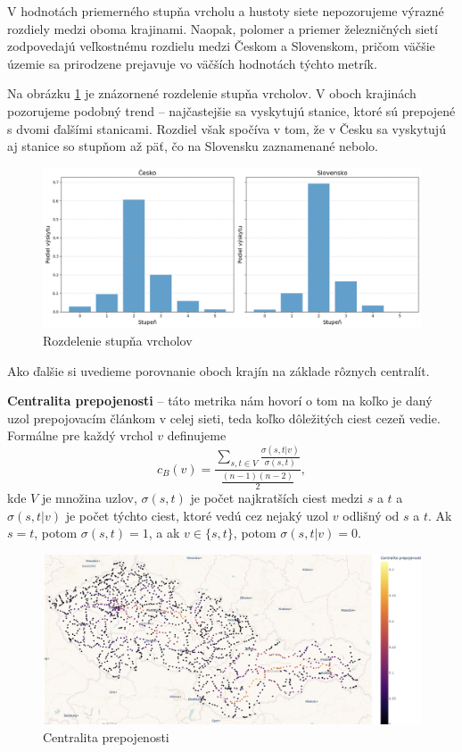 \documentclass[main.tex]{subfiles}
\begin{document}
V hodnotách priemerného stupňa vrcholu a hustoty siete nepozorujeme výrazné rozdiely medzi oboma krajinami. Naopak, polomer a priemer železničných sietí zodpovedajú veľkostnému rozdielu medzi Českom a Slovenskom, pričom väčšie územie sa prirodzene prejavuje vo väčších hodnotách týchto metrík.

Na obrázku \ref{obr:degree_distrib} je znázornené rozdelenie stupňa vrcholov. V oboch krajinách pozorujeme podobný trend – najčastejšie sa vyskytujú stanice, ktoré sú prepojené s dvomi ďalšími stanicami. Rozdiel však spočíva v tom, že v Česku sa vyskytujú aj stanice so stupňom až päť, čo na Slovensku zaznamenané nebolo.

\begin{figure}
    \centerline{\includegraphics[width=1.2\textwidth]{images/degree_distrib.png}}
    \caption{Rozdelenie stupňa vrcholov}
    \label{obr:degree_distrib}
\end{figure}

Ako ďalšie si uvedieme porovnanie oboch krajín na základe rôznych centralít.

\textbf{Centralita prepojenosti} -- táto metrika nám hovorí o tom na koľko je daný uzol prepojovacím článkom v celej sieti, teda koľko dôležitých ciest cezeň vedie. Formálne pre každý vrchol $v$ definujeme 
\begin{equation*}
    c_B(v) =\frac{\sum_{s,t \in V} \frac{\sigma(s, t|v)}{\sigma(s, t)}}{\frac{(n-1)(n-2)}{2}},
\end{equation*}
kde $V$ je množina uzlov, $\sigma(s, t)$ je počet najkratších ciest medzi $s$ a $t$ a $\sigma(s, t |v)$ je počet týchto ciest, ktoré vedú cez nejaký uzol $v$ odlišný od $s$ a $t$. Ak $s = t$, potom $\sigma(s, t) = 1$, a ak $v \in \{s, t \}$, potom $\sigma(s, t |v ) = 0$. 

\begin{figure}
    \centerline{\includegraphics[width=1.2\textwidth]{images/betweenes.png}}
    \caption{Centralita prepojenosti}
    \label{obr:betweenes}
\end{figure}
\end{document}
